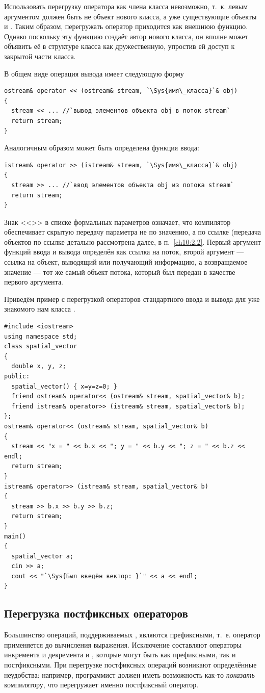 Использовать перегрузку оператора как члена класса невозможно, т.~к. левым аргументом должен быть не объект нового
класса, а уже существующие объекты  и . Таким образом, перегружать
оператор приходится как внешнюю функцию. Однако поскольку эту функцию создаёт автор нового класса, он вполне может
объявить её в структуре класса как дружественную, упростив ей доступ к закрытой части класса. 

В общем виде операция вывода имеет следующую форму 
\begin{lstlisting}
ostream& operator << (ostream& stream, `\Sys{имя\_класса}`& obj)
{
  stream << ... //`вывод элементов объекта obj в поток stream`
  return stream;
} 
\end{lstlisting}
Аналогичным образом может быть определена функция ввода: 
\begin{lstlisting}
istream& operator >> (istream& stream, `\Sys{имя\_класса}`& obj)
{
  stream >> ... //`ввод элементов объекта obj из потока stream`
  return stream;
} 
\end{lstlisting}

Знак <<\Sys{\&}>> в списке формальных параметров означает, что компилятор обеспечивает скрытую передачу
параметра не по значению, а по ссылке (передача объектов по ссылке детально рассмотрена далее, в п.~\ref{ch10:2.2}.  Первый
аргумент функций ввода и вывода определён как ссылка на поток, второй аргумент --- ссылка на объект, выводящий или
получающий информацию, а возвращаемое значение --- тот же самый объект потока, который был передан в качестве первого
аргумента.

Приведём пример с перегрузкой операторов стандартного ввода и вывода для уже знакомого нам класса . 
\begin{lstlisting}
#include <iostream>
using namespace std;
class spatial_vector 
{
  double x, y, z;
public:
  spatial_vector() { x=y=z=0; }
  friend ostream& operator<< (ostream& stream, spatial_vector& b);
  friend istream& operator>> (istream& stream, spatial_vector& b);  
};
ostream& operator<< (ostream& stream, spatial_vector& b) 
{
  stream << "x = " << b.x << "; y = " << b.y << "; z = " << b.z << endl;
  return stream;
} 
istream& operator>> (istream& stream, spatial_vector& b) 
{
  stream >> b.x >> b.y >> b.z;
  return stream;
} 
main() 
{
  spatial_vector a;
  cin >> a;
  cout << "`\Sys{Был введён вектор: }`" << a << endl;
}
\end{lstlisting}

\subsection[Перегрузка постфиксных операторов]{Перегрузка постфиксных операторов}
Большинство операций, поддерживаемых , являются префиксными, т.~е. оператор применяется до вычисления выражения.
Исключение составляют операторы инкремента и декремента \Sys{++} и \Sys{{}-{}-},
которые могут быть как префиксными, так и постфиксными. При перегрузке постфиксных операций возникают определённые
неудобства: например, программист должен иметь возможность как-то \emph{показать} компилятору,
что перегружает именно постфиксный оператор.

